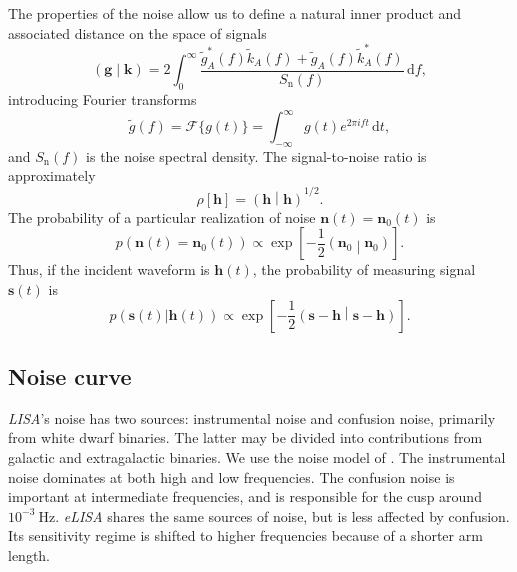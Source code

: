 \documentclass[useAMS,usedcolumn,usegraphicx,usenatbib]{mn2e}
\newcommand{\units}[1]{\ensuremath{~\mathrm{#1}}}
\newcommand{\sub}[1]{\ensuremath{_\mathrm{#1}}}
\newcommand{\dd}{\ensuremath{\mathrm{d}}}
\newcommand{\intd}[4]{\ensuremath{\int_{#1}^{#2}{#3}\,\dd{#4}}}
\newcommand{\recip}[1]{\ensuremath{\frac{1}{#1}}}
\newcommand{\innerprod}[2]{\ensuremath{\left({#1}\middle|{#2}\right)}}
\begin{document}
The properties of the noise allow us to define a natural inner product and associated distance on the space of signals \citep{Cutler1994}
\begin{equation}
\innerprod{\boldsymbol{g}}{\boldsymbol{k}} = 2\intd{0}{\infty}{\frac{\tilde{g}_A^\ast(f)\tilde{k}_A(f) + \tilde{g}_A(f)\tilde{k}_A^\ast(f)}{S\sub{n}(f)}}{f},
\label{eq:inner}
\end{equation}
introducing Fourier transforms
\begin{equation}
\tilde{g}(f) = \mathscr{F}\{g(t)\} = \intd{-\infty}{\infty}{g(t)e^{2\pi i ft}}{t},
\end{equation}
and $S\sub{n}(f)$ is the noise spectral density. The signal-to-noise ratio is approximately
\begin{equation}
\rho[\boldsymbol{h}] = \innerprod{\boldsymbol{h}}{\boldsymbol{h}}^{1/2}.
\label{eq:SNR}
\end{equation}
The probability of a particular realization of noise $\boldsymbol{n}(t) = \boldsymbol{n}_0(t)$ is
\begin{equation}
p(\boldsymbol{n}(t) = \boldsymbol{n}_0(t)) \propto \exp\left[-\recip{2}\innerprod{\boldsymbol{n}_0}{\boldsymbol{n}_0}\right].
\end{equation}
Thus, if the incident waveform is $\boldsymbol{h}(t)$, the probability of measuring signal $\boldsymbol{s}(t)$ is
\begin{equation}
p(\boldsymbol{s}(t)|\boldsymbol{h}(t)) \propto \exp\left[-\recip{2}\innerprod{\boldsymbol{s}-\boldsymbol{h}}{\boldsymbol{s}-\boldsymbol{h}}\right].
\label{eq:sig_prob}
\end{equation}

\subsection{Noise curve}\label{sec:Noise}

\textit{LISA}'s noise has two sources: instrumental noise and confusion noise, primarily from white dwarf binaries. The latter may be divided into contributions from galactic and extragalactic binaries. We use the noise model of \citet{Barack2004}. The instrumental noise dominates at both high and low frequencies. The confusion noise is important at intermediate frequencies, and is responsible for the cusp around $10^{-3}\units{Hz}$. \textit{eLISA} shares the same sources of noise, but is less affected by confusion. Its sensitivity regime is shifted to higher frequencies because of a shorter arm length.
\end{document}
